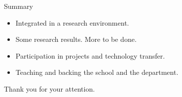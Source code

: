 \documentclass{beamer}
\begin{document}
{
\begin{frame}[plain]
\end{frame}
}

{
\begin{frame}[plain]
\end{frame}
}

{
\begin{frame}[plain]
\end{frame}
}

\begin{frame}{Summary}

  \begin{block}{}
        \begin{center}
          \begin{itemize}
            \item Integrated in a research environment.
            \item Some research results. More to be done.
            \item Participation in projects and technology transfer.
            \item Teaching and backing the school and the department.
          \end{itemize}
        \end{center}
  \end{block}
  
  \vskip 1cm
        \begin{center}
          Thank you for your attention. 

        \end{center}
\end{frame}
\end{document}
